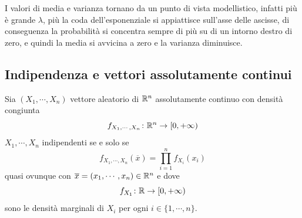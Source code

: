 \documentclass[a4paper]{article}
\begin{document}
I valori di media e varianza tornano da un punto di vista modellistico,
infatti più è grande \(\lambda\), più la coda dell'esponenziale
si appiattisce sull'asse delle ascisse, di conseguenza la probabilità
si concentra sempre di più su di un intorno destro di zero, e quindi la media
si avvicina a zero e la varianza diminuisce.


\subsection{Indipendenza e vettori assolutamente continui}

\begin{snippetproposition}{}
    Sia \((X_1, \cdots, X_n)\)
    vettore aleatorio di \(\mathbb{R}^n\)
    assolutamente continuo con densità congiunta
    \[
        f_{X_1, \cdots, X_n} \colon \mathbb{R}^n \to [0,+\infty)
    \]
    \(X_1, \cdots, X_n\) indipendenti se e solo se
    \[
        f_{X_1, \cdots, X_n}(\overline x)
        = \prod_{i=1}^n f_{X_i}(x_i)
    \]
    quasi ovunque con \(\overline x = (x_1, \cdots, x_n) \in \mathbb{R}^n\)
    e dove \[
        f_{X_1} \colon \mathbb{R} \to [0,+\infty)
    \]
    sono le densità marginali di \(X_i\) per ogni \(i \in \{1, \cdots, n\}\).
\end{snippetproposition}
\end{document}
